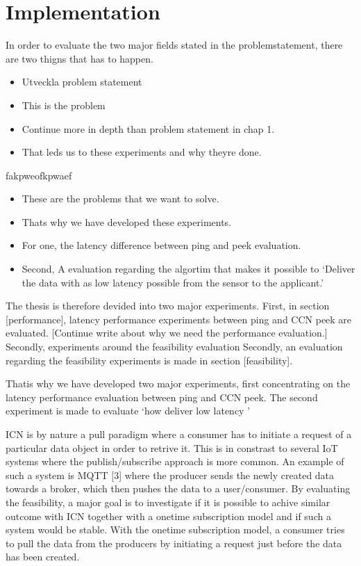 \section{Implementation}

In order to evaluate the two major fields stated in the problemstatement, there are two thigns that has to happen.


\begin{itemize}
\item Utveckla problem statement

\item This is the problem
\item Continue more in depth than problem statement in chap 1.
\item That leds us to these experiments and why theyre done.
\end{itemize}
fakpweofkpwaef
\begin{itemize}
\item These are the problems that we want to solve.
\item Thats why we have developed these experiments.
\item For one, the latency difference between ping and peek evaluation.
\item Second, A evaluation regarding the algortim that makes it possible to `Deliver the data with as low latency possible from the sensor to the applicant.'


\end{itemize}

The thesis is therefore devided into two major experiments. First, in section [performance], latency performance experiments between ping and CCN peek are evaluated. [Continue write about why we need the performance evaluation.]
Secondly, experiments around the feasibility evaluation
Secondly, an evaluation regarding the feasibility experiments is made in section [feasibility]. 

Thatis why we have developed two major experiments, first concentrating on the latency performance evaluation between ping and CCN peek. The second experiment is made to evaluate `how deliver low latency '

ICN is by nature a pull paradigm where a consumer has to initiate a request of a particular data object in order to retrive it. This is in constrast to several IoT systems where the publish/subscribe approach is more common. An example of such a system is MQTT [3] where the producer sends the newly created data towards a broker, which then pushes the data to a user/consumer. By evaluating the feasibility, a major goal is to investigate if it is possible to achive similar outcome with ICN together with a onetime subscription model and if such a system would be stable. With the onetime subscription model, a consumer tries to pull the data from the producers by initiating a request just before the data has been created.


